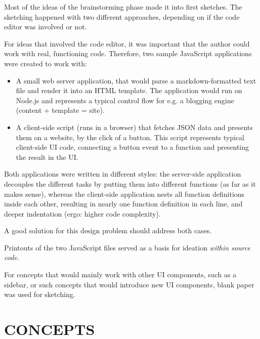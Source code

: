 Most of the ideas of the brainstorming phase made it into first
sketches. The sketching happened with two different approaches,
depending on if the code editor was involved or not.

For ideas that involved the code editor, it was important that the
author could work with real, functioning code. Therefore, two sample
JavaScript applications were created to work with:

\begin{itemize}
\itemsep1pt\parskip0pt
\item
  A small web server application, that would parse a markdown-formatted
  text file and render it into an HTML template. The application would
  run on Node.js and represents a typical control flow for e.g. a
  blogging engine (content + template = site).
\item
  A client-side script (runs in a browser) that fetches JSON data and
  presents them on a website, by the click of a button. This script
  represents typical client-side UI code, connecting a button event to a
  function and presenting the result in the UI.
\end{itemize}

Both applications were written in different styles: the server-side
application decouples the different tasks by putting them into different
functions (as far as it makes sense), whereas the client-side
application nests all function definitions inside each other, resulting
in nearly one function definition in each line, and deeper indentation
(ergo: higher code complexity).

A good solution for this design problem should address both cases.

Printouts of the two JavaScript files served as a basis for ideation
\emph{within source code}.

For concepts that would mainly work with other UI components, such as a
sidebar, or such concepts that would introduce new UI components, blank
paper was used for sketching.

\section{CONCEPTS}\label{concepts}

